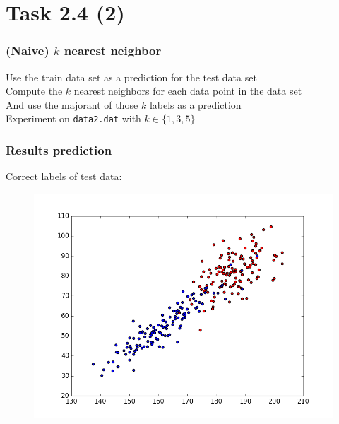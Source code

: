 \documentclass{beamer}
\begin{document}
\section{Task 2.4 (2)}

\begin{frame}
	\frametitle{(Naive) $k$ nearest neighbor}
	Use the train data set as a prediction for the test data set \\\medskip
	Compute the $k$ nearest neighbors for each data point in the data set \\\medskip
	And use the majorant of those $k$ labels as a prediction \\\medskip
	Experiment on \texttt{data2.dat} with $k \in \{1,3,5\}$
\end{frame}

\begin{frame}
\frametitle{Results prediction}
	Correct labels of test data:
	\begin{figure}
	\includegraphics[height=0.8\textheight]{graphics/testWithCorrect}
	\end{figure}
\end{frame} 
\end{document}
